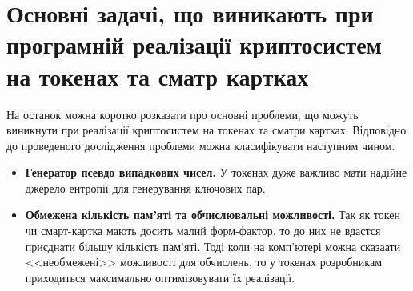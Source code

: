 
\section{Основні задачі, що виникають при програмній реалізації криптосистем на токенах та сматр картках}

На останок можна коротко розказати про основні проблеми, що можуть виникнути при реалізації криптосистем на токенах та сматри картках. Відповідно до проведеного дослідження проблеми можна класифікувати наступним чином.

\begin{itemize}
    \item \textbf{Генератор псевдо випадкових чисел.} У токенах дуже важливо мати надійне джерело ентропії для генерування ключових пар.
    \item \textbf{Обмежена кількість пам'яті та обчислювальні можливості.} Так як токен чи смарт-картка мають досить малий форм-фактор, то до них не вдастся приєднати більшу кількість пам'яті. Тоді коли на комп'ютері можна сказаати <<необмежені>> можливості для обчислень, то у токенах розробникам приходиться максимально оптимізовувати їх реалізації. 
\end{itemize}